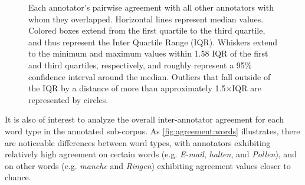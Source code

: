 \begin{figure}[phtb]
			\caption[Pairwise agreement statistics by annotator]{Each annotator's pairwise agreement with all other annotators with whom they overlapped.
			Horizontal lines represent median values. Colored boxes extend from the first quartile to the third quartile, and thus represent the Inter Quartile Range (IQR). Whiskers extend to the minimum and maximum values within 1.58 IQR of the first and third quartiles, respectively, and roughly represent a 95\% confidence interval around the median. 
			 Outliers that fall outside of the IQR by a distance of more than approximately 1.5$\times$IQR  are represented by circles.%
			}
			\label{fig:agreement:annotators}
		\end{figure}
		
		It is also of interest to analyze the overall inter-annotator agreement for each word type in the annotated sub-corpus. As \cref{fig:agreement:words} illustrates, there are noticeable differences between word types, with annotators exhibiting relatively high agreement on certain words (e.g. \textit{E-mail}, \textit{halten}, and \textit{Pollen}), and on other words (e.g. \textit{manche} and \textit{Ringen}) exhibiting agreement values closer to chance. 
		
